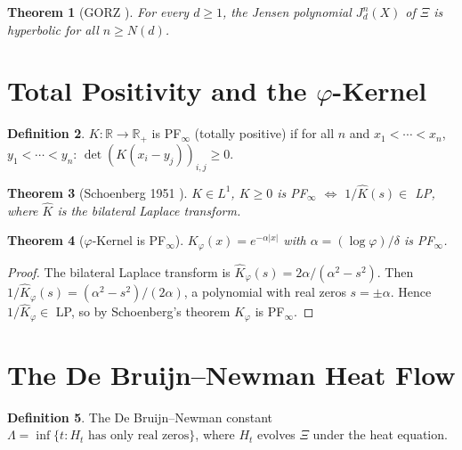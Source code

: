 \documentclass[11pt,a4paper]{article}
\newtheorem{theorem}{Theorem}[section]
\theoremstyle{definition}
\newtheorem{definition}[theorem]{Definition}
\theoremstyle{remark}
\newcommand{\R}{\mathbb{R}}
\newcommand{\vp}{\varphi}
\begin{document}
\begin{theorem}[GORZ {\cite{gorz2019}}]
For every $d \geq 1$, the Jensen polynomial $J_d^n(X)$ of $\Xi$ is hyperbolic for all $n \geq N(d)$.
\end{theorem}

\section{Total Positivity and the $\vp$-Kernel}

\begin{definition}
$K : \R \to \R_+$ is PF$_\infty$ (totally positive) if for all $n$ and $x_1 < \cdots < x_n$, $y_1 < \cdots < y_n$:
$\det(K(x_i - y_j))_{i,j} \geq 0$.
\end{definition}

\begin{theorem}[Schoenberg 1951 {\cite{schoenberg1951}}]
$K \in L^1$, $K \geq 0$ is PF$_\infty$ $\iff$ $1/\hat{K}(s) \in$ LP, where $\hat{K}$ is the bilateral Laplace transform.
\end{theorem}

\begin{theorem}[$\vp$-Kernel is PF$_\infty$]
$K_\vp(x) = e^{-\alpha|x|}$ with $\alpha = (\log\vp)/\delta$ is PF$_\infty$.
\end{theorem}

\begin{proof}
The bilateral Laplace transform is $\hat{K}_\vp(s) = 2\alpha/(\alpha^2 - s^2)$. Then $1/\hat{K}_\vp(s) = (\alpha^2 - s^2)/(2\alpha)$, a polynomial with real zeros $s = \pm\alpha$. Hence $1/\hat{K}_\vp \in$ LP, so by Schoenberg's theorem $K_\vp$ is PF$_\infty$.
\end{proof}

\section{The De Bruijn--Newman Heat Flow}

\begin{definition}
The De Bruijn--Newman constant $\Lambda = \inf\{t : H_t \text{ has only real zeros}\}$, where $H_t$ evolves $\Xi$ under the heat equation.
\end{definition}
\end{document}
